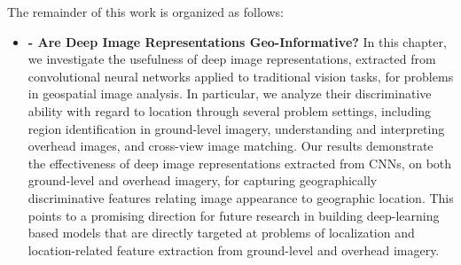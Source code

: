 The remainder of this work is organized as follows:
  
\begin{itemize}[noitemsep]

  \item \textbf{ - Are Deep Image Representations
    Geo-Informative?} \newline \newline In this chapter, we
    investigate the usefulness of deep image representations,
    extracted from convolutional neural networks applied to
    traditional vision tasks, for problems in geospatial image
    analysis. In particular, we analyze their discriminative ability
    with regard to location through several problem settings,
    including region identification in ground-level imagery,
    understanding and interpreting overhead images, and cross-view
    image matching.  Our results demonstrate the effectiveness of deep
    image representations extracted from CNNs, on both ground-level
    and overhead imagery, for capturing geographically discriminative
    features relating image appearance to geographic location.  This
    points to a promising direction for future research in building
    deep-learning based models that are directly targeted at problems
    of localization and location-related feature extraction from
    ground-level and overhead imagery. \newline

\end{itemize}
